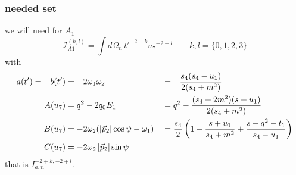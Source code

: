 \subsubsection{needed set}
we will need for $A_1$
\begin{equation}
\mathcal I_{A1}^{(k,l)} = \int\!d\Omega_n\,{t'}^{-2+k} {u_7}^{-2+l} \qquad k,l = \{0,1,2,3\}
\end{equation}
with
\begin{align}
a(t') = -b(t') &= -2\omega_1\omega_2 &&= -\frac{s_4(s_4-u_1)}{2(s_4+m^2)}\\
A(u_7) &= q^2-2q_0E_1 &&= q^2-\frac{(s_4+2m^2)(s+u_1)}{2(s_4+m^2)}\\
B(u_7) &= -2\omega_2(\left|\vec p_2\right|\cos\psi-\omega_1) &&=\frac {s_4}{2}\left(1-\frac{s+u_1}{s_4+m^2}+\frac{s-q^2-t_1}{s_4-u_1}\right)\\
C(u_7) &= -2\omega_2\left|\vec p_2\right|\sin\psi
\end{align}
that is $I_{a,n}^{-2+k,-2+l}$.
